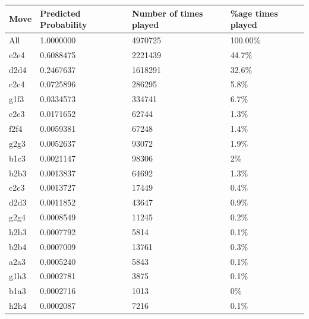 \begin{table}[]
\centering
\begin{tabular}{@{}llll@{}}
\toprule
Move & Predicted Probability & Number of times played & \%age times played \\ 
\midrule
All  & 1.0000000             & 4970725                & 100.00\%           \\ 
\midrule
e2e4 & 0.6088475             & 2221439                & 44.7\%             \\
d2d4 & 0.2467637             & 1618291                & 32.6\%             \\
c2c4 & 0.0725896             & 286295                 & 5.8\%              \\
g1f3 & 0.0334573             & 334741                 & 6.7\%              \\
e2e3 & 0.0171652             & 62744                  & 1.3\%              \\
f2f4 & 0.0059381             & 67248                  & 1.4\%              \\
g2g3 & 0.0052637             & 93072                  & 1.9\%              \\
b1c3 & 0.0021147             & 98306                  & 2\%                \\
b2b3 & 0.0013837             & 64692                  & 1.3\%              \\
c2c3 & 0.0013727             & 17449                  & 0.4\%              \\
d2d3 & 0.0011852             & 43647                  & 0.9\%              \\
g2g4 & 0.0008549             & 11245                  & 0.2\%              \\
h2h3 & 0.0007792             & 5814                   & 0.1\%              \\
b2b4 & 0.0007009             & 13761                  & 0.3\%              \\
a2a3 & 0.0005240             & 5843                   & 0.1\%              \\
g1h3 & 0.0002781             & 3875                   & 0.1\%              \\
b1a3 & 0.0002716             & 1013                   & 0\%                \\
h2h4 & 0.0002087             & 7216                   & 0.1\%              \\

\end{tabular}
\end{table}
